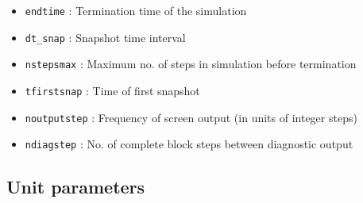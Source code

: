 \documentclass[a4paper]{article}
\newcommand{\var}[1]{\texttt{#1}}
\begin{document}
\begin{itemize}
\item \var{endtime} : Termination time of the simulation

\item \var{dt\_snap} : Snapshot time interval

\item \var{nstepsmax} : Maximum no. of steps in simulation before termination

\item \var{tfirstsnap} : Time of first snapshot

\item \var{noutputstep} : Frequency of screen output (in units of integer steps)

\item \var{ndiagstep} : No. of complete block steps between diagnostic output


\end{itemize}


\subsection{Unit parameters}
\end{document}
